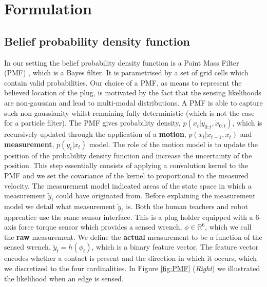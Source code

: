 \section{Formulation}\label{ch4:formulation}

\subsection{Belief probability density function}

In our setting the belief probability density function is a Point Mass Filter (PMF) \cite[p.87]{Bergman99recursivebayesian},
which is a  Bayes filter. It is parametrised by a set of grid cells  which contain valid probabilities.
Our choice of a PMF, as means to represent the believed location of the plug, is motivated by the fact that the 
sensing likelihoods are non-gaussian and lead to multi-modal distributions. A PMF is able to capture such non-gaussianity whilst
remaining fully deterministic (which is not the case for a particle filter).
The PMF gives probability density, $p(x_t|y_{0:t},\dot{x}_{0:t})$, which is recursively updated through the 
application of a \textbf{motion}, $p(x_t|x_{t-1},\dot{x}_t)$ and \textbf{measurement}, $p(y_t|x_t)$ model. 
The role of the motion model is to update the position of the probability density function and increase the uncertainty 
of the position. This step essentially consists of applying a convolution kernel to the PMF and we set the covariance 
of the kernel to proportional to the measured velocity.
The measurement model indicated areas of the state space in which a measurement $\tilde{y}_t$ could have originated from. Before explaining the measurement model we detail what  
measurement $\tilde{y}_t$ is. Both the human teachers and robot apprentice use the same sensor interface. This is a plug holder
equipped with a 6-axis force torque sensor which provides a sensed wrench, $\phi \in \mathbb{R}^6$, which we
call the \textbf{raw} measurement. We define the \textbf{actual} measurement to be a function of the sensed wrench, 
$\tilde{y}_t = h(\phi_t)$, which is a binary feature vector. The feature vector encodes whether a contact is present 
and the direction in which it occurs, which we discretized to the four cardinalities.
In Figure \ref{fig:PMF} (\textit{Right}) we illustrated the likelihood when an edge is sensed.


